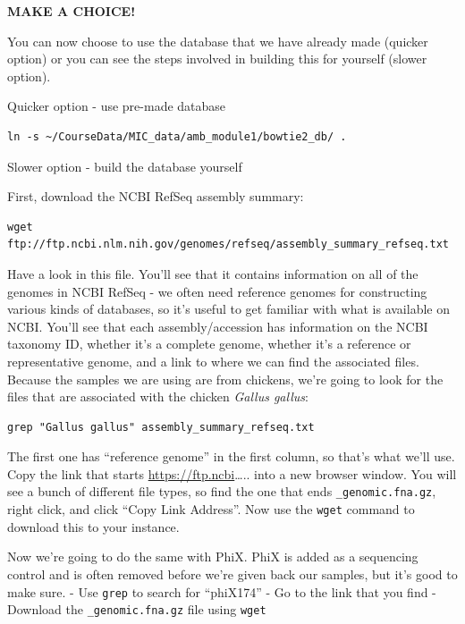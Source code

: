 \documentclass[
]{book}
\newenvironment{greenbox}{
  \definecolor{shadecolor}{RGB}{141, 181, 128}
  \color{white}
  \begin{shaded}}
 {\end{shaded}}
\begin{document}
\begin{greenbox}

\begin{center}
\textbf{MAKE A CHOICE!}

\end{center}

You can now choose to use the database that we have already made (quicker option) or you can see the steps involved in building this for yourself (slower option).

\end{greenbox}

Quicker option - use pre-made database

\begin{verbatim}
ln -s ~/CourseData/MIC_data/amb_module1/bowtie2_db/ .
\end{verbatim}

Slower option - build the database yourself

First, download the NCBI RefSeq assembly summary:

\begin{verbatim}
wget ftp://ftp.ncbi.nlm.nih.gov/genomes/refseq/assembly_summary_refseq.txt
\end{verbatim}

Have a look in this file. You'll see that it contains information on all of the genomes in NCBI RefSeq - we often need reference genomes for constructing various kinds of databases, so it's useful to get familiar with what is available on NCBI. You'll see that each assembly/accession has information on the NCBI taxonomy ID, whether it's a complete genome, whether it's a reference or representative genome, and a link to where we can find the associated files. Because the samples we are using are from chickens, we're going to look for the files that are associated with the chicken \emph{Gallus gallus}:

\begin{verbatim}
grep "Gallus gallus" assembly_summary_refseq.txt
\end{verbatim}

The first one has ``reference genome'' in the first column, so that's what we'll use. Copy the link that starts \url{https://ftp.ncbi}\ldots.. into a new browser window. You will see a bunch of different file types, so find the one that ends \texttt{\_genomic.fna.gz}, right click, and click ``Copy Link Address''. Now use the \texttt{wget} command to download this to your instance.

Now we're going to do the same with PhiX. PhiX is added as a sequencing control and is often removed before we're given back our samples, but it's good to make sure.
- Use \texttt{grep} to search for ``phiX174''
- Go to the link that you find
- Download the \texttt{\_genomic.fna.gz} file using \texttt{wget}
\end{document}
